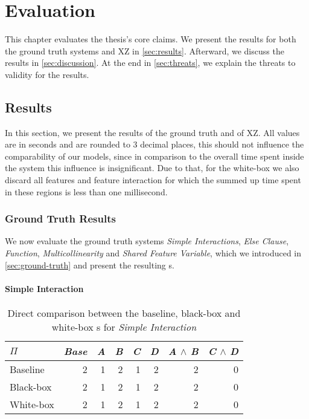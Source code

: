 \chapter{Evaluation}\label{ch:evaluation}
\lstset{style=myStyle}

This chapter evaluates the thesis's core claims.  
We present the results for both the ground truth systems and \textsc{XZ} in \autoref{sec:results}.
Afterward, we discuss the results in \autoref{sec:discussion}. At the end in \autoref{sec:threats}, we explain the threats to validity for the results.

\section{Results}\label{sec:results}

In this section, we present the results of the ground truth and of \textsc{XZ}. 
All values are in seconds and are rounded to 3 decimal places, this should not influence the comparability of our models, since in comparison
to the overall time spent inside the system this influence is insignificant. Due to that, for the white-box we also discard all features
and feature interaction for which the summed up time spent in these regions is less than one millisecond.

\subsection{Ground Truth Results}
We now evaluate the ground truth systems \emph{Simple Interactions}, \emph{Else Clause}, \emph{Function}, \emph{Multicollinearity} 
and \emph{Shared Feature Variable}, which we introduced in \autoref{sec:ground-truth} and present the resulting {\perfInfluenceModel}s.

\subsubsection*{Simple Interaction}

\begin{table}[H]
    \centering
    \begin{tabular}{lrrrrrrr}
    \toprule
    $\Pi$    & \emph{Base} & \emph{A} & \emph{B} & \emph{C} & \emph{D} & \emph{A} $\land$ \emph{B} & \emph{C} $\land$ \emph{D}  \\ \midrule
    Baseline & 2    & 1 & 2 & 1 & 2 & 2           & 0            \\
    Black-box & 2    & 1 & 2 & 1 & 2 & 2           & 0           \\
    White-box & 2    & 1 & 2 & 1 & 2 & 2           & 0           \\ \bottomrule
    \end{tabular}  
    \caption{Direct comparison between the baseline, black-box and white-box {\perfInfluenceModel}s for \emph{Simple Interaction}}\label{aggr:results-simple-interaction}
\end{table}

